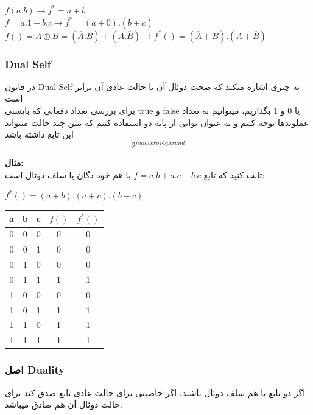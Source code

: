 \documentclass[pt, a5paper]{article}
\begin{document}
\raggedright
$f(a.b) \rightarrow f^{*} = a+b$\\
$f = a.1 + \overline{b}.c \rightarrow f^{*}=(a+0) . (\overline{b}+c) $\\
$f()= A \oplus B = (\overline{A}.B) + (A.\overline{B}) \rightarrow f^{*}()= (\overline{A}+B) . (A+\overline{B})$


\raggedleft
\justifying
\subsubsection{Dual Self}
در قانون Dual Self به چیزی اشاره میکند که صحت دوئال آن با حالت عادی آن برابر است\\
برای بررسی تعداد دفعاتی که بایستی true و false یا 0 و 1 بگذاریم، میتوانیم به تعداد عملوندها توجه کنیم و به عنوان توانی از پایه دو استفاده کنیم که ببین چند حالت میتواند این تابع داشته باشد\\
\begin{equation}
	2^{number of Operand}
\end{equation}


\textbf{مثال:}\\
ثابت کنید که تابع
$f=a.b + a.c + b.c$
با هم خود دگان یا سلف دوئال است:\\

\raggedright
$f^{*}() = (a+b).(a+c).(b+c)$

\center
\begin{LTR}
\begin{tabular}{ c c c | c | c}
	a & b & c & $f()$ & $f^{*}()$\\
	\hline
	0 & 0 & 0 & 0 & 0 \\ 				
	0 & 0 & 1 & 0 & 0\\
	0 & 1 & 0 & 0 & 0\\
	0 & 1 & 1 & 1 & 1\\
	1 & 0 & 0 & 0 & 0\\
	1 & 0 & 1 & 1 & 1\\
	1 & 1 & 0 & 1 & 1\\
	1 & 1 & 1 & 1 & 1\\
\end{tabular}
\end{LTR}
\raggedleft
\justifying

\subsubsection{اصل Duality}
اگر دو تابع با هم سلف دوئال باشند، اگر خاصیتی برای حالت عادی تابع صدق کند برای حالت دوئال آن هم صادق میباشد.\\
\end{document}
